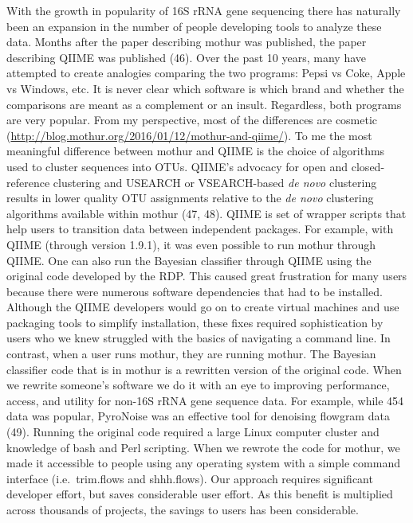 \documentclass[11pt,]{article}
\begin{document}
With the growth in popularity of 16S rRNA gene sequencing there has
naturally been an expansion in the number of people developing tools to
analyze these data. Months after the paper describing mothur was
published, the paper describing QIIME was published (46). Over the past
10 years, many have attempted to create analogies comparing the two
programs: Pepsi vs Coke, Apple vs Windows, etc. It is never clear which
software is which brand and whether the comparisons are meant as a
complement or an insult. Regardless, both programs are very popular.
From my perspective, most of the differences are cosmetic
(\url{http://blog.mothur.org/2016/01/12/mothur-and-qiime/}). To me the
most meaningful difference between mothur and QIIME is the choice of
algorithms used to cluster sequences into OTUs. QIIME's advocacy for
open and closed-reference clustering and USEARCH or VSEARCH-based
\emph{de novo} clustering results in lower quality OTU assignments
relative to the \emph{de novo} clustering algorithms available within
mothur (47, 48). QIIME is set of wrapper scripts that help users to
transition data between independent packages. For example, with QIIME
(through version 1.9.1), it was even possible to run mothur through
QIIME. One can also run the  Bayesian classifier through
QIIME using the original code developed by the RDP. This caused great
frustration for many users because there were numerous software
dependencies that had to be installed. Although the QIIME developers
would go on to create virtual machines and use packaging tools to
simplify installation, these fixes required sophistication by users who
we knew struggled with the basics of navigating a command line. In
contrast, when a user runs mothur, they are running mothur. The
 Bayesian classifier code that is in mothur is a rewritten
version of the original code. When we rewrite someone's software we do
it with an eye to improving performance, access, and utility for non-16S
rRNA gene sequence data. For example, while 454 data was popular,
PyroNoise was an effective tool for denoising flowgram data (49).
Running the original code required a large Linux computer cluster and
knowledge of bash and Perl scripting. When we rewrote the code for
mothur, we made it accessible to people using any operating system with
a simple command interface (i.e.~trim.flows and shhh.flows). Our
approach requires significant developer effort, but saves considerable
user effort. As this benefit is multiplied across thousands of projects,
the savings to users has been considerable.
\end{document}
